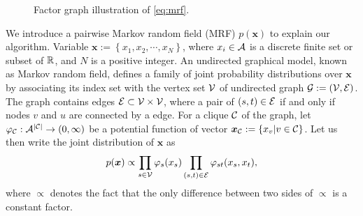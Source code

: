 \documentclass[conference,onecolumn]{IEEEtran}
\begin{document}
\begin{figure}
  \begin{centering}
    \caption{Factor graph illustration of \autoref{eq:mrf}.}\label{fig:factor-graph}
    \vspace{0.1cm}
  \end{centering}
\end{figure}
We introduce a pairwise Markov random field (MRF) $p(\bm{x})$ to
explain our algorithm. Variable $\bm{x} := \left\{ x_1, x_2, \cdots,
  x_N \right\}$, where $x_i \in \mathcal{A}$ is a discrete finite set or subset of
$\mathbb{R}$, and $N$ is a positive integer.
An undirected graphical model, known as Markov random field, defines a
family of joint probability distributions over $\bm{x}$ by associating
its index set with the vertex set $\mathcal{V}$ of undirected graph
$\mathcal{G}:=(\mathcal{V}, \mathcal{E})$. The graph contains edges $\mathcal{E} \subset \mathcal{V} \times
\mathcal{V}$, where a pair of $(s, t) \in \mathcal{E}$ if and only if nodes $v$ and
$u$ are connected by a edge. For a clique $\mathcal{C}$ of the graph, let
$\varphi_{\mathcal{C}}: \mathcal{A}^{| \mathcal{C} |} \rightarrow (0, \infty)$ be a potential
function of vector $\bm{x}_{\mathcal{C}}:=\left\{ x_v| v\in \mathcal{C} \right\}$. Let
us then write the joint distribution of $\bm{x}$ as
\begin{equation}\label{eq:mrf}
  p(\bm{x}) \propto \prod_{{s\in \mathcal{V}}} \varphi_s(x_s) \prod_{(s,t) \in \mathcal{E}} \varphi_{st}(x_s, x_t),
\end{equation}
where $\propto$ denotes the fact that the only difference between two sides of $\propto$ is a constant factor.
\end{document}
